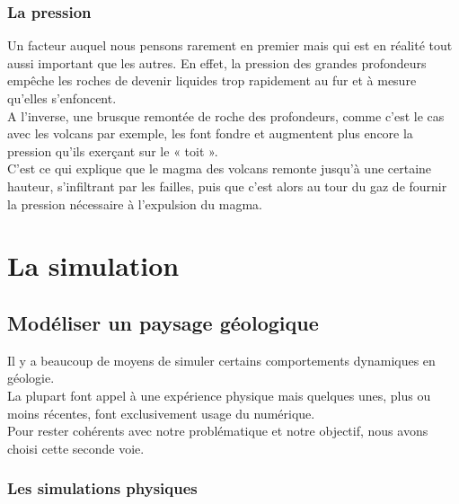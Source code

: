 \documentclass[a4paper,11pt]{article}
\begin{document}
\subsubsection{La pression}

Un facteur auquel nous pensons rarement en premier mais qui est en réalité tout aussi important que les autres.
En effet, la pression des grandes profondeurs empêche les roches de devenir liquides trop rapidement au fur et à mesure qu'elles s'enfoncent.\\
A l'inverse, une brusque remontée de roche des profondeurs, comme c'est le cas avec les volcans par exemple, les font fondre et augmentent plus encore la pression qu'ils exerçant sur le « toit ».\\
C'est ce qui explique que le magma des volcans remonte jusqu'à une certaine hauteur, s'infiltrant par les failles, puis que c'est alors au tour du gaz de fournir la pression nécessaire à l'expulsion du magma.

\section{La simulation}

\subsection{Modéliser un paysage géologique}

Il y a beaucoup de moyens de simuler certains comportements dynamiques en géologie.\\
La plupart font appel à une expérience physique mais quelques unes, plus ou moins récentes, font exclusivement usage du numérique.\\
Pour rester cohérents avec notre problématique et notre objectif, nous avons choisi cette seconde voie.

\subsubsection{Les simulations physiques}
\end{document}
